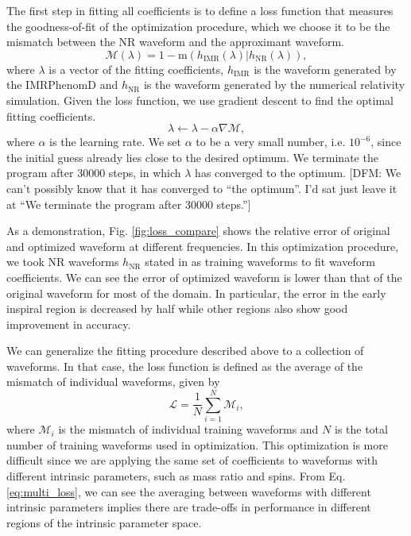 \documentclass[twocolumn]{aastex631}
\newcommand{\dfm}[1]{{\color{dfm}[DFM: #1]}}
\begin{document}
The first step in fitting all coefficients is to define a loss function that
measures the goodness-of-fit of the optimization procedure, which we choose it
to be the mismatch between the NR waveform and the approximant waveform.
\begin{equation}
    \label{eq:mismatch}
	\mathcal{M}(\lambda)=1-\mathrm{m}(h_{\mathrm{IMR}}(\lambda)|h_{\mathrm{NR}}(\lambda)),
\end{equation}
where $\lambda$ is a vector of the fitting coefficients, $h_{\mathrm{IMR}}$ is
the waveform generated by the IMRPhenomD and $h_{\mathrm{NR}}$ is the waveform
generated by the numerical relativity simulation. 
Given the loss function, we use gradient descent to find the optimal fitting
coefficients.
\begin{equation}
	\lambda\leftarrow\lambda-\alpha\nabla\mathcal{M}, 
\end{equation}
where $\alpha$ is the learning rate. We set $\alpha$ to be a very small number, i.e. $10^{-6}$, since the initial guess already lies close to the desired optimum. We terminate the program after 30000 steps, in which $\lambda$ has converged to the optimum.  \dfm{We can't possibly know that it has converged to ``the optimum''. I'd sat just leave it at ``We terminate the program after 30000 steps.''}

As a demonstration, Fig. \ref{fig:loss_compare} shows the relative error of
original and optimized waveform at different frequencies. In this optimization
procedure, we took NR waveforms $h_{\mathrm{NR}}$ stated in \citep{Khan:2015jqa}
as training waveforms to fit waveform coefficients.   
We can see the error of optimized waveform is lower than that of the original waveform for most of the domain.
In particular, the error in the early inspiral region is decreased by half while other regions also show good improvement in accuracy. 

We can generalize the fitting procedure described above to a collection of waveforms.
In that case, the loss function is defined as the average of the mismatch of
individual waveforms, given by
\begin{equation}
	\mathcal{L}=\frac{1}{N}\sum_{i=1}^{N}\mathcal{M}_i,
    \label{eq:multi_loss}
\end{equation}
where $\mathcal{M}_i$ is the mismatch of individual training waveforms and $N$
is the total number of training waveforms used in optimization. This
optimization is more difficult since we are applying the same set of
coefficients to waveforms with different intrinsic parameters, such as mass
ratio and spins. From Eq. \ref{eq:multi_loss}, we can see the averaging between
waveforms with different intrinsic parameters implies there are trade-offs in
performance in different regions of the intrinsic parameter space.
\end{document}
